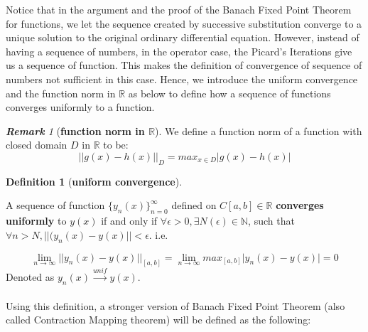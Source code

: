 \documentclass{article}
\theoremstyle{definition}
\newtheorem{definition}{Definition}[section]
\theoremstyle{remark}
\newtheorem*{remark}{\textbf{Remark}}
\theoremstyle{example}
\begin{document}
Notice that in the argument and the proof of the Banach Fixed Point Theorem for functions, we let the sequence created by successive substitution converge to a unique solution to the original ordinary differential equation. However, instead of having a sequence of numbers, in the operator case, the Picard's Iterations give us a sequence of function. This makes the definition of convergence of sequence of numbers not sufficient in this case. Hence, we introduce the uniform convergence and the function norm in $\mathbb{R}$ as below to define how a sequence of functions converges uniformly to a function.

\begin{remark}[\textbf{function norm in $\mathbb{R}$}]
    We define a function norm of a function with closed domain $D$ in $\mathbb{R}$ to be:
    \begin{equation}
        \lvert\lvert g(x) - h(x) \rvert\rvert_{D} = max_{x\in D}{\lvert g(x) - h(x)\rvert}
    \end{equation}
\end{remark}

\begin{definition}[\textbf{uniform convergence}]\label{def:uniConv}

A sequence of function $\{y_n(x)\}_{n = 0}^{\infty}$ defined on $C[a,b] \in \mathbb{R}$ \textbf{converges uniformly} to $y(x)$ if and only if $\forall \epsilon > 0, \exists N(\epsilon) \in \mathbb{N}$, such that $\forall n > N, {\lvert\lvert(y_n(x) - y(x)\rvert\rvert} < \epsilon$. i.e. 

\begin{equation}
    \lim_{n \to \infty}{\lvert\lvert y_n(x) - y(x) \rvert\rvert_{[a,b]}} = \lim_{n \to \infty}{max_{[a,b]}{\lvert y_n(x)-y(x)\rvert}} = 0
\end{equation}
Denoted as $y_n(x) \xrightarrow{unif} y(x)$.
\end{definition}

\paragraph{  }

Using this definition, a stronger version of Banach Fixed Point Theorem (also called Contraction Mapping theorem) will be defined as the following:
\end{document}
